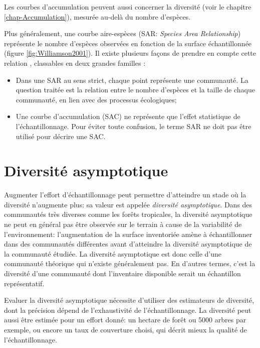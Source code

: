 \documentclass[
  11pt,
  american,
  a4paper,
  extrafontsizes,onecolumn,openright
  ]{memoir}
\providecommand{\tightlist}{%
  \setlength{\itemsep}{0pt}\setlength{\parskip}{0pt}}
\newlength{\rf}
\begin{document}
\normalsize

Les courbes d'accumulation peuvent aussi concerner la diversité (voir le chapitre \ref{chap-Accumulation}), mesurée au-delà du nombre d'espèces.

Plus généralement, une courbe aire-espèces (SAR: \emph{Species Area Relationship}) représente le nombre d'espèces observées en fonction de la surface échantillonnée (figure \ref{fig:Williamson2001}).
Il existe plusieurs façons de prendre en compte cette relation \autocite{Scheiner2003}, classables en deux grandes familles \autocite{Dengler2009}:

\begin{itemize}
\tightlist
\item
  Dans une SAR au sens strict, chaque point représente une communauté.
  La question traitée est la relation entre le nombre d'espèces et la taille de chaque communauté, en lien avec des processus écologiques;
\item
  Une courbe d'accumulation (SAC) ne représente que l'effet statistique de l'échantillonnage.
  Pour éviter toute confusion, le terme SAR ne doit pas être utilisé pour décrire une SAC.
\end{itemize}

\section{Diversité asymptotique}\label{diversituxe9-asymptotique}

Augmenter l'effort d'échantillonnage peut permettre d'atteindre un stade où la diversité n'augmente plus: sa valeur est appelée \emph{diversité asymptotique}.
Dans des communautés très diverses comme les forêts tropicales, la diversité asymptotique ne peut en général pas être observée sur le terrain à cause de la variabilité de l'environnement: l'augmentation de la surface inventoriée amène à échantillonner dans des communautés différentes avant d'atteindre la diversité asymptotique de la communauté étudiée.
La diversité asymptotique est donc celle d'une communauté théorique qui n'existe généralement pas.
En d'autres termes, c'est la diversité d'une communauté dont l'inventaire disponible serait un échantillon représentatif.

Evaluer la diversité asymptotique nécessite d'utiliser des estimateurs de diversité, dont la précision dépend de l'exhaustivité de l'échantillonnage.
La diversité peut aussi être estimée pour un effort donné: un hectare de forêt ou 5000 arbres par exemple, ou encore un taux de couverture choisi, qui décrit mieux la qualité de l'échantillonnage.
\end{document}
